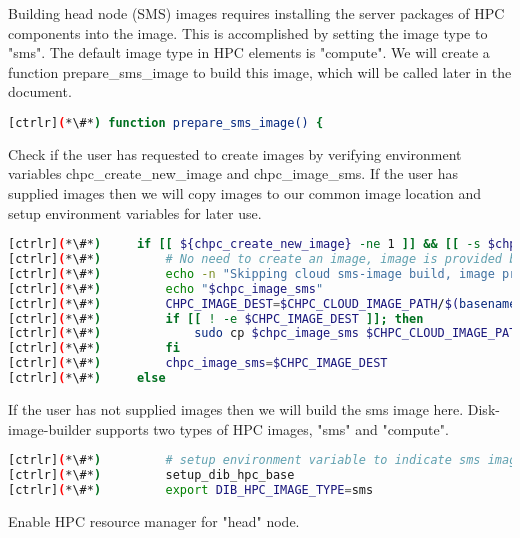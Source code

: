 	Building head node (SMS) images requires installing the server packages of HPC components into the image. This is accomplished by setting the image type to "sms". The default image type in HPC elements is "compute". We will create a function prepare\_sms\_image to build this image, which will be called later in the document.

\begin{lstlisting}[language=bash,keywords={}]
[ctrlr](*\#*) function prepare_sms_image() {
\end{lstlisting} 

	Check if the user has requested to create images by verifying environment variables chpc\_create\_new\_image and chpc\_image\_sms. If the user has supplied images then we will copy images to our common image location and setup environment variables for later use.
	
\begin{lstlisting}[language=bash,keywords={}]
[ctrlr](*\#*)     if [[ ${chpc_create_new_image} -ne 1 ]] && [[ -s $chpc_image_sms ]]; then
[ctrlr](*\#*)         # No need to create an image, image is provided by the user
[ctrlr](*\#*)         echo -n "Skipping cloud sms-image build, image provided:"
[ctrlr](*\#*)         echo "$chpc_image_sms"
[ctrlr](*\#*)         CHPC_IMAGE_DEST=$CHPC_CLOUD_IMAGE_PATH/$(basename $chpc_image_sms)
[ctrlr](*\#*)         if [[ ! -e $CHPC_IMAGE_DEST ]]; then
[ctrlr](*\#*)             sudo cp $chpc_image_sms $CHPC_CLOUD_IMAGE_PATH
[ctrlr](*\#*)         fi
[ctrlr](*\#*)         chpc_image_sms=$CHPC_IMAGE_DEST
[ctrlr](*\#*)     else
\end{lstlisting} 

	If the user has not supplied images then we will build the sms image here. Disk-image-builder supports two types of HPC images, "sms" and "compute".  

\begin{lstlisting}[language=bash,keywords={}]
[ctrlr](*\#*)         # setup environment variable to indicate sms image type
[ctrlr](*\#*)         setup_dib_hpc_base
[ctrlr](*\#*)         export DIB_HPC_IMAGE_TYPE=sms
\end{lstlisting} 

	Enable HPC resource manager for "head" node.


